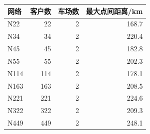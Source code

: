 \begin{tabular*}{0.84\linewidth}{@{\extracolsep{\fill}}lrrr@{}}
\toprule
网络 & 客户数 & 车场数 & 最大点间距离/km \\
\midrule
N22 & 22 & 2 & 168.7 \\
N34 & 34 & 2 & 220.4 \\
N45 & 45 & 2 & 182.8 \\
N55 & 55 & 2 & 202.3 \\
N114 & 114 & 2 & 178.1 \\
N163 & 163 & 2 & 208.5 \\
N221 & 221 & 2 & 224.6 \\
N322 & 322 & 2 & 209.3 \\
N449 & 449 & 2 & 248.1 \\
\bottomrule
\end{tabular*}
